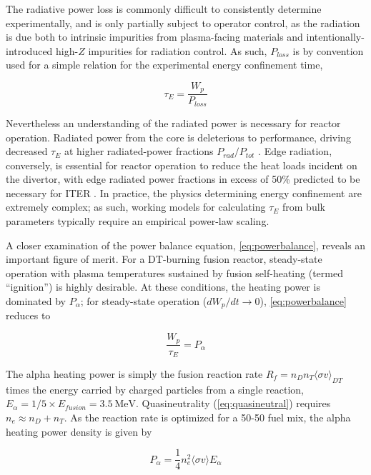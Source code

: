 \noindent The radiative power loss is commonly difficult to consistently determine experimentally, and is only partially subject to operator control, as the radiation is due both to intrinsic impurities from plasma-facing materials and intentionally-introduced high-$Z$ impurities for radiation control.  As such, $P_{loss}$ is by convention used for a simple relation for the experimental energy confinement time,

\begin{equation}\label{eq:tauE}
 \tau_E = \frac{W_p}{P_{loss}}
\end{equation}

\noindent Nevertheless an understanding of the radiated power is necessary for reactor operation.  Radiated power from the core is deleterious to performance, driving decreased $\tau_E$ at higher radiated-power fractions $P_{rad}/P_{tot}$ \cite{Greenwald1997}.  Edge radiation, conversely, is essential for reactor operation to reduce the heat loads incident on the divertor, with edge radiated power fractions in excess of 50\% predicted to be necessary for ITER \cite{Loarte2007}.  In practice, the physics determining energy confinement are extremely complex; as such, working models for calculating $\tau_E$ from bulk parameters typically require an empirical power-law scaling.

A closer examination of the power balance equation, \cref{eq:powerbalance}, reveals an important figure of merit.  For a DT-burning fusion reactor, steady-state operation with plasma temperatures sustained by fusion self-heating (termed ``ignition'') is highly desirable.  At these conditions, the heating power is dominated by $P_{\alpha}$; for steady-state operation ($dW_p/dt \rightarrow 0$), \cref{eq:powerbalance} reduces to

\begin{equation}\label{eq:powerbalance2}
 \frac{W_p}{\tau_E} = P_{\alpha}
\end{equation}

\noindent The alpha heating power is simply the fusion reaction rate $R_f = n_D n_T \langle \sigma v \rangle_{DT}$ times the energy carried by charged particles from a single reaction, $E_\alpha = 1/5 \times E_{fusion} = \SI{3.5}{\mega\electronvolt}$.  Quasineutrality (\cref{eq:quasineutral}) requires $n_e \approx n_D + n_T$.  As the reaction rate is optimized for a 50-50 fuel mix, the alpha heating power density is given by

\begin{equation}\label{eq:palpha}
 P_{\alpha} = \frac{1}{4} n_e^2 \langle \sigma v \rangle E_\alpha
\end{equation}

